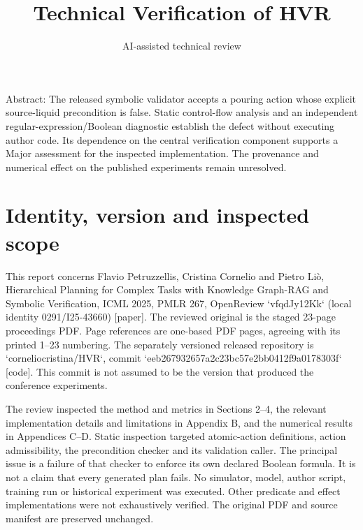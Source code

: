 \documentclass[10pt]{article}
\title{Technical Verification of HVR}
\author{AI-assisted technical review}
\date{}
\begin{document}
\maketitle
Abstract: The released symbolic validator accepts a pouring action whose explicit source-liquid precondition is false. Static control-flow analysis and an independent regular-expression/Boolean diagnostic establish the defect without executing author code. Its dependence on the central verification component supports a Major assessment for the inspected implementation. The provenance and numerical effect on the published experiments remain unresolved.\par
\section*{Identity, version and inspected scope}
This report concerns Flavio Petruzzellis, Cristina Cornelio and Pietro Liò, Hierarchical Planning for Complex Tasks with Knowledge Graph-RAG and Symbolic Verification, ICML 2025, PMLR 267, OpenReview `vfqdJy12Kk` (local identity 0291/I25-43660) [paper]. The reviewed original is the staged 23-page proceedings PDF. Page references are one-based PDF pages, agreeing with its printed 1–23 numbering. The separately versioned released repository is `corneliocristina/HVR`, commit `eeb267932657a2c23bc57e2bb0412f9a0178303f` [code]. This commit is not assumed to be the version that produced the conference experiments.\par
The review inspected the method and metrics in Sections 2–4, the relevant implementation details and limitations in Appendix B, and the numerical results in Appendices C–D. Static inspection targeted atomic-action definitions, action admissibility, the precondition checker and its validation caller. The principal issue is a failure of that checker to enforce its own declared Boolean formula. It is not a claim that every generated plan fails. No simulator, model, author script, training run or historical experiment was executed. Other predicate and effect implementations were not exhaustively verified. The original PDF and source manifest are preserved unchanged.\par
\end{document}

